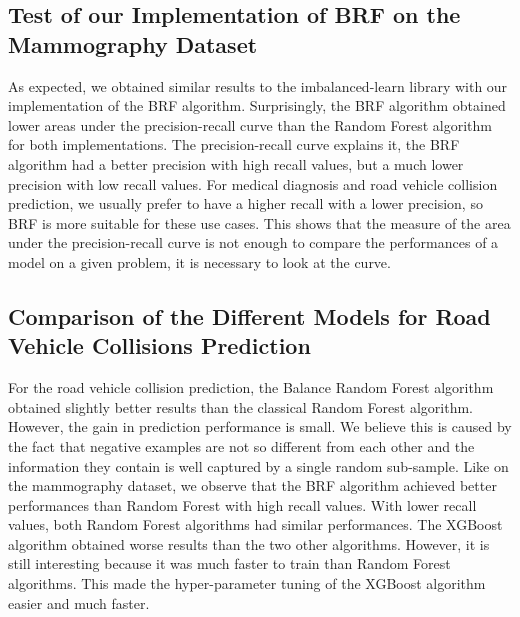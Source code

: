 \documentclass[conference]{IEEEtran}
\begin{document}
\subsection{Test of our Implementation of BRF on the Mammography Dataset}
As expected, we obtained similar results to the imbalanced-learn library with our implementation of the BRF algorithm. Surprisingly, the BRF algorithm obtained lower areas under the precision-recall curve than the Random Forest algorithm for both implementations. The precision-recall curve explains it, the BRF algorithm had a better precision with high recall values, but a much lower precision with low recall values. For medical diagnosis and road vehicle collision prediction, we usually prefer to have a higher recall with a lower precision, so BRF is more suitable for these use cases. This shows that the measure of the area under the precision-recall curve is not enough to compare the performances of a model on a given problem, it is necessary to look at the curve. 

\subsection{Comparison of the Different Models for Road Vehicle Collisions Prediction}
For the road vehicle collision prediction, the Balance Random Forest algorithm obtained slightly better results than the classical Random Forest algorithm. However, the gain in prediction performance is small. 
We believe this is caused by the fact that negative examples are not so different from each other and the information they contain is well captured by a single random sub-sample. Like on the mammography dataset, we observe that the BRF algorithm achieved better performances than Random Forest with high recall values. With lower recall values, both Random Forest algorithms had similar performances. The XGBoost algorithm obtained worse results than the two other algorithms. However, it is still interesting because it was much faster to train than Random Forest algorithms. This made the hyper-parameter tuning of the XGBoost algorithm easier and much faster.
\end{document}
